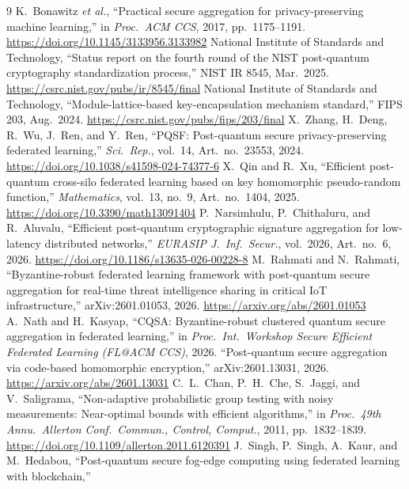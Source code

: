 \documentclass[lettersize,journal]{IEEEtran}
\begin{document}
\begin{thebibliography}{9}
 K.\ Bonawitz \emph{et al.}, ``Practical secure aggregation
for privacy-preserving machine learning,'' in \emph{Proc.\ ACM CCS}, 2017,
pp.\ 1175--1191. \url{https://doi.org/10.1145/3133956.3133982}
 National Institute of Standards and Technology, ``Status report
on the fourth round of the NIST post-quantum cryptography standardization process,''
NIST IR 8545, Mar.\ 2025. \url{https://csrc.nist.gov/pubs/ir/8545/final}
 National Institute of Standards and Technology,
``Module-lattice-based key-encapsulation mechanism standard,'' FIPS 203, Aug.\ 2024. \url{https://csrc.nist.gov/pubs/fips/203/final}
 X.\ Zhang, H.\ Deng, R.\ Wu, J.\ Ren, and Y.\ Ren, ``PQSF:
Post-quantum secure privacy-preserving federated learning,'' \emph{Sci.\ Rep.},
vol.\ 14, Art.\ no.\ 23553, 2024. \url{https://doi.org/10.1038/s41598-024-74377-6}
 X.\ Qin and R.\ Xu, ``Efficient post-quantum cross-silo
federated learning based on key homomorphic pseudo-random function,''
\emph{Mathematics}, vol.\ 13, no.\ 9, Art.\ no.\ 1404, 2025. \url{https://doi.org/10.3390/math13091404}
 P.\ Narsimhulu, P.\ Chithaluru, and R.\ Aluvalu,
``Efficient post-quantum cryptographic signature aggregation for low-latency
distributed networks,'' \emph{EURASIP J.\ Inf.\ Secur.}, vol.\ 2026, Art.\ no.\ 6, 2026. \url{https://doi.org/10.1186/s13635-026-00228-8}
 M.\ Rahmati and N.\ Rahmati, ``Byzantine-robust federated learning framework with
post-quantum secure aggregation for real-time threat intelligence sharing in
critical IoT infrastructure,'' arXiv:2601.01053, 2026. \url{https://arxiv.org/abs/2601.01053}
 A.\ Nath and H.\ Kasyap, ``CQSA: Byzantine-robust clustered quantum secure aggregation in
federated learning,'' in \emph{Proc.\ Int.\ Workshop Secure Efficient Federated Learning (FL@ACM CCS)}, 2026.
 ``Post-quantum secure aggregation via code-based homomorphic
encryption,'' arXiv:2601.13031, 2026. \url{https://arxiv.org/abs/2601.13031}
 C.\ L.\ Chan, P.\ H.\ Che, S.\ Jaggi, and V.\ Saligrama,
``Non-adaptive probabilistic group testing with noisy measurements: Near-optimal
bounds with efficient algorithms,'' in \emph{Proc.\ 49th Annu.\ Allerton Conf.\
Commun., Control, Comput.}, 2011, pp.\ 1832--1839. \url{https://doi.org/10.1109/allerton.2011.6120391}
\bibitem{singh2025pqfog} J.\ Singh, P.\ Singh, A.\ Kaur, and M.\ Hedabou,
``Post-quantum secure fog-edge computing using federated learning with blockchain,''

\end{thebibliography}
\end{document}
